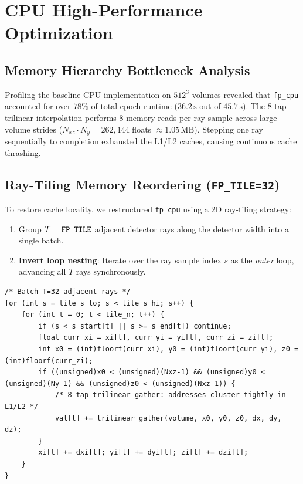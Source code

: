 \documentclass[11pt,a4paper]{article}
\begin{document}
\section{CPU High-Performance Optimization}
\label{sec:cpu_opt}

\subsection{Memory Hierarchy Bottleneck Analysis}
Profiling the baseline CPU implementation on $512^3$ volumes revealed that \texttt{fp\_cpu} accounted for over $78\%$ of total epoch runtime ($36.2\,\text{s}$ out of $45.7\,\text{s}$). The 8-tap trilinear interpolation performs 8 memory reads per ray sample across large volume strides ($N_{xz} \cdot N_y = 262{,}144$ floats $\approx 1.05\,\text{MB}$). Stepping one ray sequentially to completion exhausted the L1/L2 caches, causing continuous cache thrashing.

\subsection{Ray-Tiling Memory Reordering (\texttt{FP\_TILE=32})}
To restore cache locality, we restructured \texttt{fp\_cpu} using a 2D ray-tiling strategy:
\begin{enumerate}[noitemsep]
    \item Group $T = \text{\texttt{FP\_TILE}}$ adjacent detector rays along the detector width into a single batch.
    \item \textbf{Invert loop nesting}: Iterate over the ray sample index $s$ as the \emph{outer} loop, advancing all $T$ rays synchronously.
\end{enumerate}

\begin{lstlisting}
/* Batch T=32 adjacent rays */
for (int s = tile_s_lo; s < tile_s_hi; s++) {
    for (int t = 0; t < tile_n; t++) {
        if (s < s_start[t] || s >= s_end[t]) continue;
        float curr_xi = xi[t], curr_yi = yi[t], curr_zi = zi[t];
        int x0 = (int)floorf(curr_xi), y0 = (int)floorf(curr_yi), z0 = (int)floorf(curr_zi);
        if ((unsigned)x0 < (unsigned)(Nxz-1) && (unsigned)y0 < (unsigned)(Ny-1) && (unsigned)z0 < (unsigned)(Nxz-1)) {
            /* 8-tap trilinear gather: addresses cluster tightly in L1/L2 */
            val[t] += trilinear_gather(volume, x0, y0, z0, dx, dy, dz);
        }
        xi[t] += dxi[t]; yi[t] += dyi[t]; zi[t] += dzi[t];
    }
}
\end{lstlisting}
\end{document}
